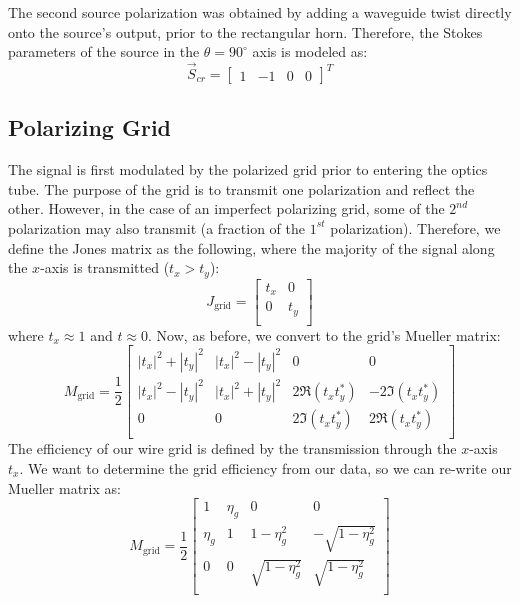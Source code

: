 The second source polarization was obtained by adding a waveguide twist directly onto the source's output, prior to the rectangular horn.  Therefore, the Stokes parameters of the source in the $\theta=90^\circ$ axis is modeled as:
\begin{equation}\vec{S}_{cr} = 
    \begin{bmatrix}
    1 & -1 & 0 & 0
    \end{bmatrix}^T
\end{equation}

\subsection{Polarizing Grid}
The signal is first modulated by the polarized grid prior to entering the optics tube.  The purpose of the grid is to transmit one polarization and reflect the other.  However, in the case of an imperfect polarizing grid, some of the $2^{nd}$ polarization may also transmit (a fraction of the $1^{st}$ polarization).  Therefore, we define the Jones matrix as the following, where the majority of the signal along the $x$-axis is transmitted ($t_x > t_y$):
\begin{equation}
    J_{\text{grid}} = \begin{bmatrix}
    t_x & 0 \\
    0 & t_y\\
  \end{bmatrix}
\end{equation}
where $t_x\approx 1$ and $t\approx 0 $.  Now, as before, we convert to the grid's Mueller matrix:
\begin{equation}
    M_{\text{grid}} =\frac{1}{2} \begin{bmatrix}
    |t_x|^2 + |t_y|^2 & |t_x|^2 - |t_y|^2 & 0& 0\\
    |t_x|^2 - |t_y|^2 & |t_x|^2 + |t_y|^2& 2\Re{(t_x t_y^*)}& -2\Im{(t_x t_y^*)}\\
    0 & 0& 2\Im{(t_x t_y^*)}& 2\Re{(t_x t_y^*)}\\
  \end{bmatrix}
\end{equation}
The efficiency of our wire grid is defined by the transmission through the $x$-axis $t_x$. We want to determine the grid efficiency from our data, so we can re-write our Mueller matrix as:
\begin{equation}
    M_{\text{grid}} =\frac{1}{2} \begin{bmatrix}
    1 & \eta_g & 0& 0\\
    \eta_g & 1& 1-\eta_g^2 & -\sqrt{1-\eta_g^2}\\
    0 & 0& \sqrt{1-\eta_g^2}& \sqrt{1-\eta_g^2}\\
  \end{bmatrix}
\end{equation}

